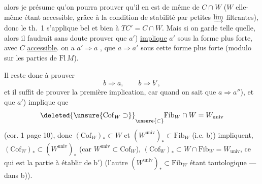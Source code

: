 
alors je présume qu'on pourra prouver
qu'il en est de même de $C\cap W$ ($W$
elle-même étant accessible, grâce à la
condition de stabilité par petites $\varinjlim$
filtrantes), donc le th.~1 s'applique bel et
bien à $TC'=C\cap W$. Mais si on garde
 telle quelle, alors il faudrait sans doute
prouver que $a'$) \uline{implique} $a'$ sous la forme
plus forte, avec $C$ \uline{accessible}.   on a $a'\Rightarrow a$ , 
 que $a\Rightarrow a'$ sous cette forme plus forte
 (modulo    sur les
parties  de $\mathrm{Fl}\,M$).

Il reste donc à prouver
\[
 b\Rightarrow a,\qquad b\Rightarrow b',
\]
et il suffit de prouver la première implication,
car quand on sait que $a\Rightarrow a''$), et que $a'$)
implique que
\[
 \deleted{\unsure{\mathrm{Cof}_W\supset}}\underset{\unsure{\subset}}{\vphantom{F}}\mathrm{Fib}_W\cap W=W_{\mathrm{univ}}
\]
(cor. 1 page 10), donc $(\mathrm{Cof}_W)_*\subset W$ et $(W^{\mathrm{univ}})_*\subset\mathrm{Fib}_W$
 (i.e. b)) impliquent, $(\mathrm{Cof}_W)_*\subset(W^{\mathrm{univ}})_*$
(car $W^{\mathrm{univ}}\subset\mathrm{Cof}_W$), 
$(\mathrm{Cof}_W)_*\subset W\cap\mathrm{Fib}_W=W_{\mathrm{univ}}$,
ce qui est la partie à établir de b$'$) (l'autre
$(W^{\mathrm{univ}})_*\subset\mathrm{Fib}_W$ étant tautologique ---
 dans b)).
